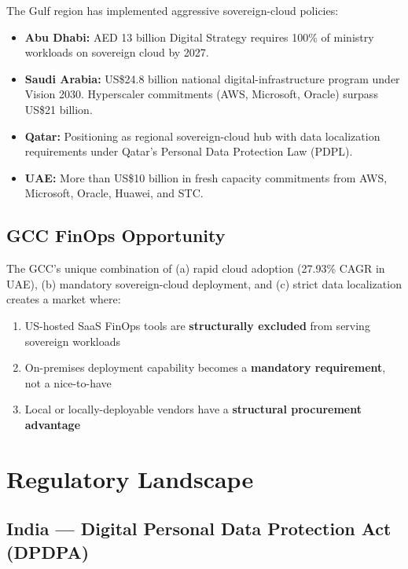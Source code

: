 \documentclass[a4paper,11pt]{article}
\begin{document}
The Gulf region has implemented aggressive sovereign-cloud policies:

\begin{itemize}[itemsep=2mm]
    \item \textbf{Abu Dhabi:} AED 13 billion Digital Strategy requires 100\% of ministry workloads on sovereign cloud by 2027.
    \item \textbf{Saudi Arabia:} US\$24.8 billion national digital-infrastructure program under Vision 2030. Hyperscaler commitments (AWS, Microsoft, Oracle) surpass US\$21 billion.
    \item \textbf{Qatar:} Positioning as regional sovereign-cloud hub with data localization requirements under Qatar's Personal Data Protection Law (PDPL).
    \item \textbf{UAE:} More than US\$10 billion in fresh capacity commitments from AWS, Microsoft, Oracle, Huawei, and STC.
\end{itemize}

\subsection{GCC FinOps Opportunity}

The GCC's unique combination of (a) rapid cloud adoption (27.93\% CAGR in UAE), (b) mandatory sovereign-cloud deployment, and (c) strict data localization creates a market where:

\begin{enumerate}[itemsep=1mm]
    \item US-hosted SaaS FinOps tools are \textbf{structurally excluded} from serving sovereign workloads
    \item On-premises deployment capability becomes a \textbf{mandatory requirement}, not a nice-to-have
    \item Local or locally-deployable vendors have a \textbf{structural procurement advantage}
\end{enumerate}

\section{Regulatory Landscape}

\subsection{India --- Digital Personal Data Protection Act (DPDPA)}
\end{document}
